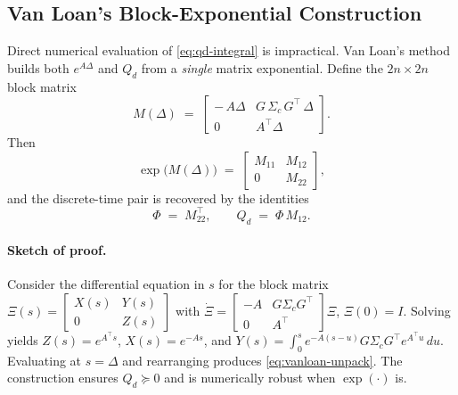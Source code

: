 \documentclass[10pt]{extarticle}
\begin{document}
\subsection{Van Loan’s Block-Exponential Construction}
Direct numerical evaluation of \eqref{eq:qd-integral} is impractical. Van Loan’s method builds
both $e^{A\Delta}$ and $Q_d$ from a \emph{single} matrix exponential. Define the $2n\times 2n$ block matrix
\begin{equation}
M(\Delta) \;=\; 
\begin{bmatrix}
-\,A\Delta & G\,\Sigma_c\,G^\top\,\Delta\\[2pt]
0 & A^\top\Delta
\end{bmatrix}.
\label{eq:vanloan-M}
\end{equation}
Then
\begin{equation}
\exp\!\big(M(\Delta)\big) \;=\;
\begin{bmatrix}
M_{11} & M_{12}\\[2pt]
0 & M_{22}
\end{bmatrix},
\label{eq:vanloan-exp}
\end{equation}
and the discrete-time pair is recovered by the identities
\begin{equation}
\Phi \;=\; M_{22}^\top,\qquad
Q_d \;=\; \Phi\,M_{12}.
\label{eq:vanloan-unpack}
\end{equation}

\paragraph{Sketch of proof.}
Consider the differential equation in $s$ for the block matrix
\(
\Xi(s)=
\begin{bmatrix}
X(s) & Y(s)\\ 0 & Z(s)
\end{bmatrix}
\)
with $\dot\Xi = 
\begin{bmatrix}
- A & G\Sigma_c G^\top\\ 0 & A^\top
\end{bmatrix}\Xi$, $\Xi(0)=I$.
Solving yields $Z(s)=e^{A^\top s}$, $X(s)=e^{-As}$,
and $Y(s)=\int_0^s e^{-A(s-u)} G\Sigma_c G^\top e^{A^\top u}\,du$.
Evaluating at $s=\Delta$ and rearranging produces \eqref{eq:vanloan-unpack}.
The construction ensures $Q_d\succeq 0$ and is numerically robust when $\exp(\cdot)$ is.
\end{document}
